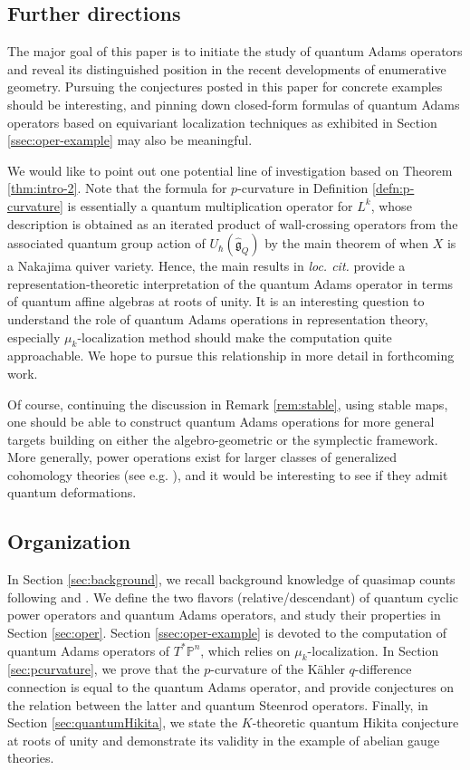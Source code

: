 \documentclass[reqno]{amsart}
\numberwithin{equation}{section}
\numberwithin{equation}{section}
\numberwithin{equation}{section}
\theoremstyle{definition}
\theoremstyle{remark}
\theoremstyle{remark}
\begin{document}
\subsection{Further directions}
The major goal of this paper is to initiate the study of quantum Adams operators and reveal its distinguished position in the recent developments of enumerative geometry. Pursuing the conjectures posted in this paper for concrete examples should be interesting, and pinning down closed-form formulas of quantum Adams operators based on equivariant localization techniques as exhibited in Section \ref{ssec:oper-example} may also be meaningful. 

We would like to point out one potential line of investigation based on Theorem \ref{thm:intro-2}. Note that the formula for $p$-curvature in Definition \ref{defn:p-curvature} is essentially a quantum multiplication operator for $L^k$, whose description is obtained as an iterated product of wall-crossing operators from the associated quantum group action of $U_\hbar (\hat{\mathfrak{g}}_Q)$ by the main theorem of \cite{okounkov-smirnov} when $X$ is a Nakajima quiver variety. Hence, the main results in \emph{loc. cit.} provide a representation-theoretic interpretation of the quantum Adams operator in terms of quantum affine algebras at roots of unity. It is an interesting question to understand the role of quantum Adams operations in representation theory, especially $\mu_k$-localization method should make the computation quite approachable. We hope to pursue this relationship in more detail in forthcoming work.

Of course, continuing the discussion in Remark \ref{rem:stable}, using stable maps, one should be able to construct quantum Adams operations for more general targets building on either the algebro-geometric \cite{lee-K} or the symplectic \cite{AMS2} framework. More generally, power operations exist for larger classes of generalized cohomology theories (see e.g. \cite[Section 9]{devalapurkar-satake}), and it would be interesting to see if they admit quantum deformations.

\subsection{Organization}
In Section \ref{sec:background}, we recall background knowledge of quasimap counts following \cite{quasi-map} and \cite{okounkov15}. We define the two flavors (relative/descendant) of quantum cyclic power operators and quantum Adams operators, and study their properties in Section \ref{sec:oper}. Section \ref{ssec:oper-example} is devoted to the computation of quantum Adams operators of $T^* \mathbb{P}^n$, which relies on $\mu_k$-localization. In Section \ref{sec:pcurvature}, we prove that the $p$-curvature of the K\"ahler $q$-difference connection is equal to the quantum Adams operator, and provide conjectures on the relation between the latter and quantum Steenrod operators. Finally, in Section \ref{sec:quantumHikita}, we state the $K$-theoretic quantum Hikita conjecture at roots of unity and demonstrate its validity in the example of abelian gauge theories.
\end{document}
